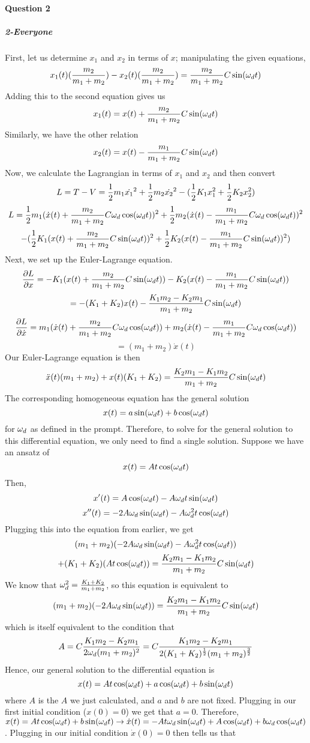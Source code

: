 \paragraph{Question 2}
\subparagraph{2-Everyone}
First, let us determine $x_1$ and $x_2$ in terms of $x$; manipulating the given equations,
$$x_1(t)(\frac{m_2}{m_1+m_2})-x_2(t)(\frac{m_2}{m_1+m_2})=\frac{m_2}{m_1+m_2} C\sin(\omega_d t)$$
Adding this to the second equation gives us
$$x_1(t)=x(t)+\frac{m_2}{m_1+m_2} C\sin(\omega_d t)$$
Similarly, we have the other relation
$$x_2(t)=x(t)-\frac{m_1}{m_1+m_2}C\sin(\omega_d t)$$
Now, we calculate the Lagrangian in terms of $x_1$ and $x_2$ and then convert
$$L=T-V=\frac 1 2 m_1 \dot{x_1}^2+\frac 1 2 m_2 \dot{x_2}^2-(\frac 1 2 K_1 x_1^2+\frac 1 2 K_2 x_2^2)$$
$$L=\frac 1 2 m_1(\dot x(t)+\frac{m_2}{m_1+m_2} C\omega_d \cos(\omega_d t))^2+\frac 1 2 m_2(\dot x(t) -\frac{m_1}{m_1+m_2} C\omega_d \cos(\omega_d t))^2$$
$$-(\frac 1 2 K_1 (x(t)+\frac{m_2}{m_1+m_2} C\sin(\omega_d t))^2+\frac 1 2 K_2 ( x(t)-\frac{m_1}{m_1+m_2} C\sin(\omega_d t))^2)$$
Next, we set up the Euler-Lagrange equation.
$$\frac{\partial L}{\partial x}=-K_1 (x(t)+\frac{m_2}{m_1+m_2}C\sin(\omega_d t))-K_2 (x(t)-\frac{m_1}{m_1+m_2} C\sin(\omega_d t))$$
$$=-(K_1+K_2) x(t)-\frac{K_1 m_2-K_2 m_1}{m_1+m_2}C \sin(\omega_d t)$$
$$\frac{\partial L}{\partial \dot x} = m_1 (\dot x(t)+\frac{m_2}{m_1+m_2} C \omega_d \cos(\omega_d t))+m_2  (\dot x(t)-\frac{m_1}{m_1+m_2} C \omega_d \cos(\omega_d t))$$
$$= (m_1+m_2) \dot x(t)$$
Our Euler-Lagrange equation is then
$$\ddot x(t) (m_1+m_2)+ x(t) (K_1+K_2)=\frac{K_2 m_1-K_1 m_2}{m_1+m_2} C \sin(\omega_d t)$$
The corresponding homogeneous equation has the general solution
$$x(t)= a \sin(\omega_d t)+b\cos(\omega_d t)$$
for $\omega_d$ as defined in the prompt.  Therefore, to solve for the general solution to this differential equation, we only need to find a single solution.  Suppose we have an ansatz of
$$x(t)=A t\cos(\omega_d t)$$
Then, 
$$x'(t)= A\cos(\omega_d t)-A\omega_d t\sin(\omega_d t)$$
$$x''(t)=-2A\omega_d \sin(\omega_d t)-A\omega_d^2 t \cos(\omega_d t)$$
Plugging this into the equation from earlier, we get
$$(m_1+m_2)(-2A\omega_d \sin(\omega_d t)-A\omega_d^2 t \cos(\omega_d t))$$
$$+(K_1+K_2)( A t \cos(\omega_d t))=\frac{K_2 m_1-K_1 m_2}{m_1+m_2} C \sin(\omega_d t)$$
We know that $\omega_d^2 = \frac{K_1+K_2}{m_1+m_2}$, so this equation is equivalent to
$$(m_1+m_2)(-2A\omega_d \sin(\omega_d t))=\frac{K_2 m_1-K_1 m_2}{m_1+m_2} C \sin(\omega_d t)$$
which is itself equivalent to the condition that
$$A=C\frac{K_1 m_2-K_2 m_1}{2\omega_d(m_1+m_2)^2}=C\frac{K_1 m_2-K_2 m_1}{2(K_1+K_2)^{\frac 1 2}(m_1+m_2)^{\frac 3 2}}$$
Hence, our general solution to the differential equation is
$$x(t)=A t\cos(\omega_d t)+a \cos(\omega_d t)+b\sin(\omega_d t)$$
where $A$ is the $A$ we just calculated, and $a$ and $b$ are not fixed.  Plugging in our first initial condition ($x(0)=0$) we get that $a=0$.  Therefore, $x(t)=At\cos(\omega_d t)+b\sin(\omega_d t)\rightarrow \dot x(t)=-At \omega_d \sin(\omega_d t)+ A\cos(\omega_d t)+b\omega_d\cos(\omega_d t)$.  Plugging in our initial condition $\dot x(0)=0$ then tells us that
